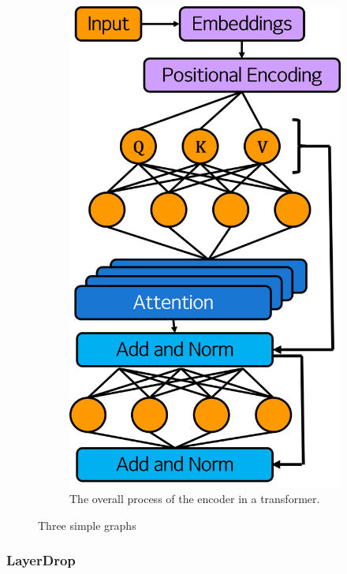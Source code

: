 \documentclass[12pt]{article}
\begin{document}
{\begin{figure}
\begin{subfigure}[b]{0.3\textwidth}
         \includegraphics[width=\textwidth]{images/transformer.png}
         \caption{The overall process of the encoder in a transformer.}
         \label{fig:transformerencoder}
     \end{subfigure}
        \caption{Three simple graphs}
        \label{fig:three graphs}
\end{figure}


\subsubsection{LayerDrop}

}
\end{document}
